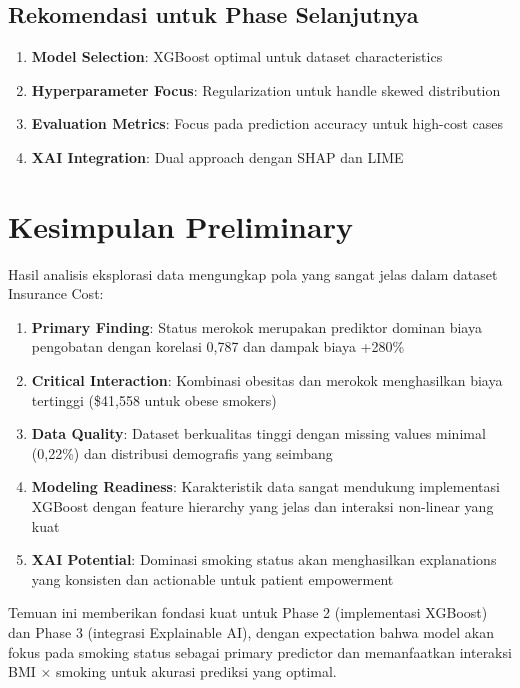 \subsection{Rekomendasi untuk Phase Selanjutnya}
\label{subsec:rekomendasi}

\begin{enumerate}
    \item \textbf{Model Selection}: XGBoost optimal untuk dataset characteristics
    \item \textbf{Hyperparameter Focus}: Regularization untuk handle skewed distribution
    \item \textbf{Evaluation Metrics}: Focus pada prediction accuracy untuk high-cost cases
    \item \textbf{XAI Integration}: Dual approach dengan SHAP dan LIME
\end{enumerate}

\section{Kesimpulan Preliminary}
\label{sec:kesimpulan-preliminary}

Hasil analisis eksplorasi data mengungkap pola yang sangat jelas dalam dataset Insurance Cost:

\begin{enumerate}
    \item \textbf{Primary Finding}: Status merokok merupakan prediktor dominan biaya pengobatan dengan korelasi 0,787 dan dampak biaya +280\%
    
    \item \textbf{Critical Interaction}: Kombinasi obesitas dan merokok menghasilkan biaya tertinggi (\$41,558 untuk obese smokers)
    
    \item \textbf{Data Quality}: Dataset berkualitas tinggi dengan missing values minimal (0,22\%) dan distribusi demografis yang seimbang
    
    \item \textbf{Modeling Readiness}: Karakteristik data sangat mendukung implementasi XGBoost dengan feature hierarchy yang jelas dan interaksi non-linear yang kuat
    
    \item \textbf{XAI Potential}: Dominasi smoking status akan menghasilkan explanations yang konsisten dan actionable untuk patient empowerment
\end{enumerate}

Temuan ini memberikan fondasi kuat untuk Phase 2 (implementasi XGBoost) dan Phase 3 (integrasi Explainable AI), dengan expectation bahwa model akan fokus pada smoking status sebagai primary predictor dan memanfaatkan interaksi BMI × smoking untuk akurasi prediksi yang optimal.

